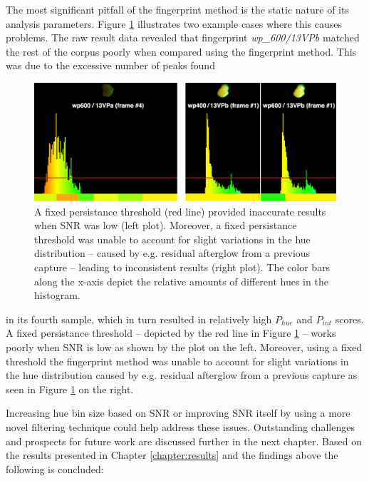 \documentclass[thesis.tex]{subfiles}
\begin{document}
The most significant pitfall of the fingerprint method is the static nature of its analysis parameters. Figure \ref{figure:fingerprint-method-pitfalls} illustrates two example cases where this causes problems. The raw result data revealed that fingerprint \emph{wp\_600/13VPb} matched the rest of the corpus poorly when compared using the fingerprint method. This was due to the excessive number of peaks found

\begin{figure}[h!]
  \centering \includegraphics[page=1,width=\textwidth]{images/findings/persistance_pitfall}
  \caption{A fixed persistance threshold (red line) provided inaccurate results when SNR was low (left plot). Moreover, a fixed persistance threshold was unable to account for slight variations in the hue distribution -- caused by e.g. residual afterglow from a previous capture -- leading to inconsistent results (right plot). The color bars along the x-axis depict the relative amounts of different hues in the histogram.}
  \label{figure:fingerprint-method-pitfalls}
\end{figure}

\clearpage

\noindent in its fourth sample, which in turn resulted in relatively high $P_{hue}$ and $P_{int}$ scores. A fixed persistance threshold -- depicted by the red line in Figure \ref{figure:fingerprint-method-pitfalls} -- works poorly when SNR is low as shown by the plot on the left. Moreover, using a fixed threshold the fingerprint method was unable to account for slight variations in the hue distribution caused by e.g. residual afterglow from a previous capture as seen in Figure \ref{figure:fingerprint-method-pitfalls} on the right.

Increasing hue bin size based on SNR or improving SNR itself by using a more novel filtering technique could help address these issues. Outstanding challenges and prospects for future work are discussed further in the next chapter. Based on the results presented in Chapter \ref{chapter:results} and the findings above the following is concluded:
\end{document}
